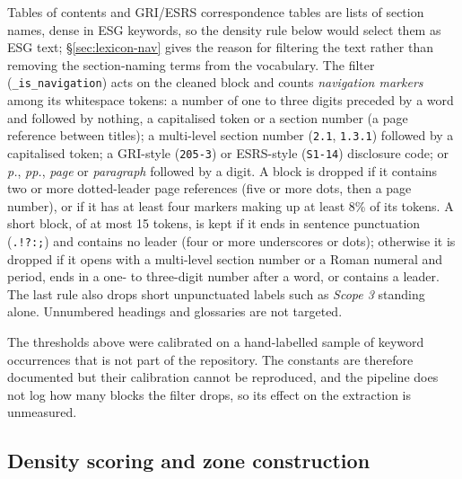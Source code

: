Tables of contents and GRI/ESRS correspondence tables are lists of section
names, dense in ESG keywords, so the density rule below would select them as
ESG text; \S\ref{sec:lexicon-nav} gives the reason for filtering the text
rather than removing the section-naming terms from the vocabulary. The filter
(\texttt{\_is\_navigation}) acts on the cleaned block and counts
\emph{navigation markers} among its whitespace tokens: a number of one to
three digits preceded by a word and followed by nothing, a capitalised token
or a section number (a page reference between titles); a multi-level section
number (\texttt{2.1}, \texttt{1.3.1}) followed by a capitalised token; a
GRI-style (\texttt{205-3}) or ESRS-style (\texttt{S1-14}) disclosure code; or
\emph{p.}, \emph{pp.}, \emph{page} or \emph{paragraph} followed by a digit. A
block is dropped if it contains two or more dotted-leader page references
(five or more dots, then a page number), or if it has at least four markers
making up at least 8\% of its tokens. A short block, of at most 15 tokens,
is kept if it ends in sentence punctuation (\texttt{.!?:;}) and contains no
leader (four or more underscores or dots); otherwise it is dropped if it
opens with a multi-level section number or a Roman numeral and period, ends
in a one- to three-digit number after a word, or contains a leader. The last
rule also drops short unpunctuated labels such as \emph{Scope 3} standing
alone. Unnumbered headings and glossaries are not targeted.

The thresholds above were calibrated on a hand-labelled sample of keyword
occurrences that is not part of the repository. The constants are therefore
documented but their calibration cannot be reproduced, and the pipeline does
not log how many blocks the filter drops, so its effect on the extraction is
unmeasured.

\subsection{Density scoring and zone construction}


